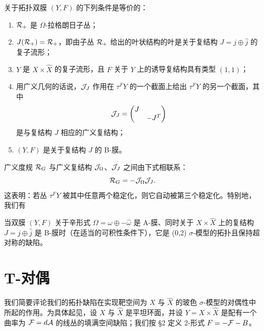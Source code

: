 \begin{proposition}[9]
关于拓扑双膜 $(Y,F)$ 的下列条件是等价的：
\begin{enumerate}
\item $\mathcal{R}_+$ 是 $\Omega$-拉格朗日子丛；
\item $J(\mathcal{R}_+)=\mathcal{R}_+$，即由子丛 $\mathcal{R}_+$ 给出的叶状结构的叶是关于复结构 $J=j\oplus\hat j$ 的复子流形；
\item $Y$ 是 $X\times\hat X$ 的复子流形，且 $F$ 关于 $Y$ 上的诱导复结构具有类型 $(1,1)$；
\item 用广义几何的话说，$\mathcal{J}_J$ 作用在 $\tau^FY$ 的一个截面上给出 $\tau^FY$ 的另一个截面，其中
\[
\mathcal{J}_J=\begin{pmatrix}J&\\ &-J^T\end{pmatrix}
\]
是与复结构 $J$ 相应的广义复结构；
\item $(Y,F)$ 是关于复结构 $J$ 的 B-膜。
\end{enumerate}
\end{proposition}

广义度规 $\mathcal{R}_G$ 与广义复结构 $\mathcal{J}_\Omega$、$\mathcal{J}_J$ 之间由下式相联系：
\[
\mathcal{R}_G=-\mathcal{J}_\Omega\mathcal{J}_J .
\]
这表明：若丛 $\tau^FY$ 被其中任意两个稳定化，则它自动被第三个稳定化。特别地，我们有

\begin{proposition}[10]
当双膜 $(Y,F)$ 关于辛形式 $\Omega=\omega\oplus-\hat\omega$ 是 A-膜、同时关于 $X\times\hat X$ 上的复结构 $J=j\oplus\hat j$ 是 B-膜时（在适当的可积性条件下），它是 (0,2) $\sigma$-模型的拓扑且保持超对称的缺陷。
\end{proposition}

\section{T-对偶}

我们简要评论我们的拓扑缺陷在实现靶空间为 $X$ 与 $\hat X$ 的玻色 $\sigma$-模型的对偶性中所起的作用。为具体起见，设 $X$ 与 $\hat X$ 是平坦环面，并设 $Y=X\times\hat X$ 是配有一个曲率为 $\mathcal{F}=d\mathcal{A}$ 的线丛的填满空间缺陷；我们按 §2 定义 2-形式 $F=-\mathcal{F}-B$。


